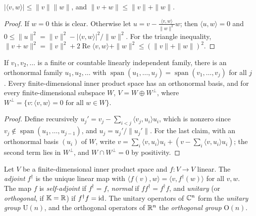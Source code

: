 \begin{proposition}\label{linear-algebra:proposition-cauchy-schwarz}
$|\langle v, w \rangle| \leq \|v\|\|w\|$, and $\|v + w\| \leq \|v\| + \|w\|$.
\end{proposition}

\begin{proof}
If $w = 0$ this is clear. Otherwise let $u = v - \frac{\langle v, w \rangle}{\|w\|^2}w$; then $\langle u, w \rangle = 0$ and
$0 \leq \|u\|^2 = \|v\|^2 - |\langle v, w \rangle|^2/\|w\|^2$. For the triangle inequality,
$\|v + w\|^2 = \|v\|^2 + 2\operatorname{Re}\langle v, w \rangle + \|w\|^2 \leq (\|v\| + \|w\|)^2$.
\end{proof}

\begin{theorem}\label{linear-algebra:theorem-gram-schmidt}
If $v_1, v_2, \ldots$ is a finite or countable linearly independent family, there is an orthonormal family
$u_1, u_2, \ldots$ with $\operatorname{span}(u_1, \ldots, u_j) = \operatorname{span}(v_1, \ldots, v_j)$ for all $j$. Every
finite-dimensional inner product space has an orthonormal basis, and for every finite-dimensional
subspace $W$, $V = W \oplus W^\perp$, where $W^\perp = \{v : \langle v, w \rangle = 0 \text{ for all } w \in W\}$.
\end{theorem}

\begin{proof}
Define recursively $u_j' = v_j - \sum_{i<j}\langle v_j, u_i \rangle u_i$, which is nonzero since
$v_j \notin \operatorname{span}(u_1, \ldots, u_{j-1})$, and $u_j = u_j'/\|u_j'\|$. For the last claim, with an
orthonormal basis $(u_i)$ of $W$, write $v = \sum_i \langle v, u_i \rangle u_i + (v - \sum_i \langle v, u_i\rangle u_i)$;
the second term lies in $W^\perp$, and $W \cap W^\perp = 0$ by positivity.
\end{proof}

\begin{definition}\label{linear-algebra:definition-adjoint}
Let $V$ be a finite-dimensional inner product space and $f \colon V \to V$ linear. The \emph{adjoint} $f^\dagger$ is
the unique linear map with $\langle f(v), w \rangle = \langle v, f^\dagger(w) \rangle$ for all $v, w$. The map $f$ is
\emph{self-adjoint} if $f^\dagger = f$, \emph{normal} if $ff^\dagger = f^\dagger f$, and \emph{unitary} (or
\emph{orthogonal}, if $\mathbb{K} = \mathbb{R}$) if $f^\dagger f = \mathrm{id}$. The unitary operators of $\mathbb{C}^n$ form the
\emph{unitary group} $\mathrm{U}(n)$, and the orthogonal operators of $\mathbb{R}^n$ the \emph{orthogonal group}
$\mathrm{O}(n)$.
\end{definition}

